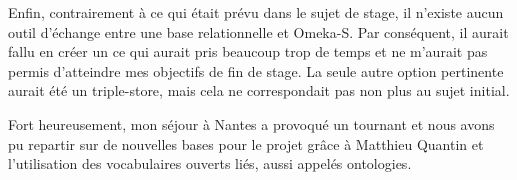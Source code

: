Enfin, contrairement à ce qui était prévu dans le sujet de stage, il n'existe aucun outil d'échange entre une base relationnelle et Omeka-S. Par conséquent, il aurait fallu en créer un ce qui aurait pris beaucoup trop de temps et ne m'aurait pas permis d'atteindre mes objectifs de fin de stage. La seule autre option pertinente aurait été un triple-store, mais cela ne correspondait pas non plus au sujet initial.

Fort heureusement, mon séjour à Nantes a provoqué un tournant et nous avons pu repartir sur de nouvelles bases pour le projet grâce à Matthieu Quantin et l'utilisation des vocabulaires ouverts liés, aussi appelés ontologies.
